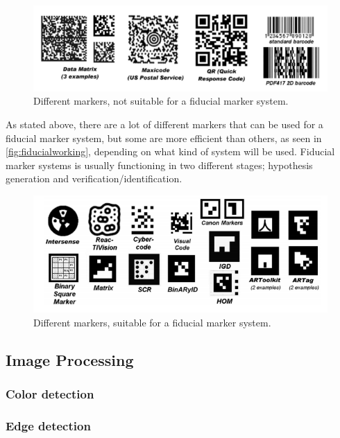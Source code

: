 				
					\begin{figure}[H]
						\centering
						\includegraphics[width=0.9\linewidth]{figure/Analysis/fiducialmarkers.png}
						\caption{Different markers, not suitable for a fiducial marker system.}
						\label{fig:fiducialmarkers}
					\end{figure}
					
				
				As stated above, there are a lot of different markers that can be used for a fiducial marker system, but some are more efficient than others, as seen in \autoref{fig:fiducialworking}, depending on what kind of system will be used.
				Fiducial marker systems is usually functioning in two different stages; hypothesis generation and verification/identification.\\
				
				
				
				\begin{figure}[H]
					\centering
					\includegraphics[width=0.9\linewidth]{figure/Analysis/fiducialworking.png}
					\caption{Different markers, suitable for a fiducial marker system.}
					\label{fig:fiducialworking}
				\end{figure}
				

		\subsection{Image Processing}
			\subsubsection{Color detection}
			
			\subsubsection{Edge detection}
			
